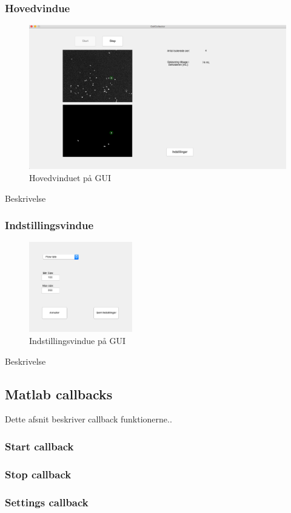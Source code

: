 \subsubsection{Hovedvindue}
\begin{figure}[H]
	\centering
	\includegraphics[width=1\textwidth]{billeder/software/gui_main.png}
	\caption{Hovedvinduet på GUI}
	\label{fig:finishedGUI}
\end{figure}

Beskrivelse
\subsubsection{Indstillingsvindue}
\begin{figure}[H]
	\centering
	\includegraphics[width=0.4\textwidth]{billeder/software/settings.png}
	\caption{Indstillingsvindue på GUI}
	\label{fig:finishedSettings}
\end{figure}

Beskrivelse

\newpage
\subsection{Matlab callbacks}
Dette afsnit beskriver callback funktionerne..
\subsubsection{Start callback}

\subsubsection{Stop callback}

\subsubsection{Settings callback}